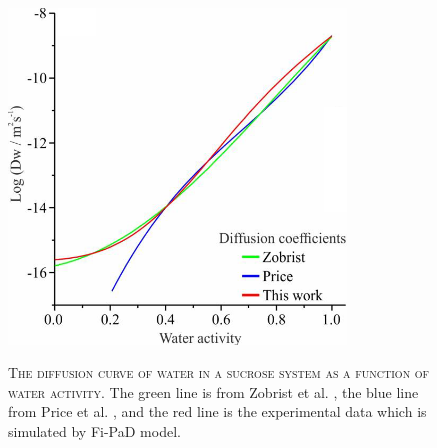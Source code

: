 \begin{figure}
    \centering
    \caption[The diffusion curve of water in a sucrose system as a function of water activity]{\textsc{The diffusion curve of water in a sucrose system as a function of water activity}. The green line is from Zobrist et al. \cite{C0CP01273D}, the blue line from Price et al. \cite{Price2014}, and the red line is the experimental data which is simulated by Fi-PaD model.}
    \includegraphics[width=0.8\textwidth]{chapters/water_hopping/figures/image058.png}
    \label{fig:wat_s11}
\end{figure}

\clearpage

